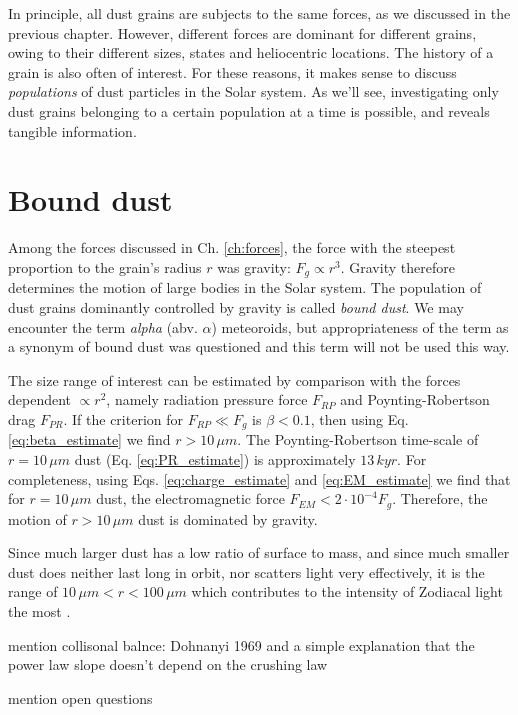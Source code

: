 In principle, all dust grains are subjects to the same forces, as we discussed in the previous chapter. However, different forces are dominant for different grains, owing to their different sizes, states and  heliocentric locations. The history of a grain is also often of interest. For these reasons, it makes sense to discuss \textit{populations} of dust particles in the Solar system. As we'll see, investigating only dust grains belonging to a certain population at a time is possible, and reveals tangible information. 

\section{Bound dust}

Among the forces discussed in Ch. \ref{ch:forces}, the force with the steepest proportion to the grain's radius $r$ was gravity: $F_g \propto r^3$. Gravity therefore determines the motion of large bodies in the Solar system. The population of dust grains dominantly controlled by gravity is called \textit{bound dust}. We may encounter the term \textit{alpha} (abv. $\alpha$) meteoroids, but appropriateness of the term as a synonym of bound dust was questioned \citep{sommer2023alpha} and this term will not be used this way.

The size range of interest can be estimated by comparison with the forces dependent $\propto r^2$, namely radiation pressure force $F_{RP}$ and Poynting-Robertson drag $F_{PR}$. If the criterion for $F_{RP} \ll F_g$ is $\beta<0.1$, then using Eq. \ref{eq:beta_estimate} we find $r>10 \, \si{\mu m}$. The Poynting-Robertson time-scale of $r=10 \, \si{\mu m}$ dust (Eq. \ref{eq:PR_estimate}) is approximately $13 \, \si{kyr}$. For completeness, using Eqs. \ref{eq:charge_estimate} and \ref{eq:EM_estimate} we find that for $r=10 \, \si{\mu m}$ dust, the electromagnetic force $F_{EM} < 2\cdot 10^{-4} F_g$. Therefore, the motion of $r>10 \, \si{\mu m}$ dust is dominated by gravity.

Since much larger dust has a low ratio of surface to mass, and since much smaller dust does neither last long in orbit, nor scatters light very effectively, it is the range of $10 \, \si{\mu m} < r < 100 \, \si{\mu m}$ which contributes to the intensity of Zodiacal light the most \citep{leinert1981zodiacal}. 

mention collisonal balnce:  Dohnanyi 1969 and a simple explanation that the power law slope doesn't depend on the crushing law

mention open questions

